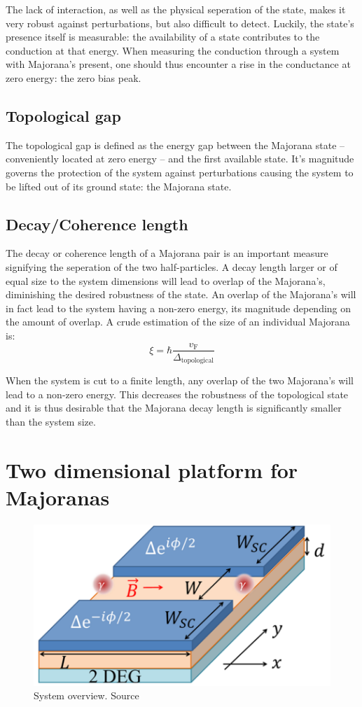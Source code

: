 		The lack of interaction, as well as the physical seperation of the state, makes it very robust against perturbations, but also difficult to detect.
		Luckily, the state's presence itself is measurable: the availability of a state contributes to the conduction at that energy.
		When measuring the conduction through a system with Majorana's present, one should thus encounter a rise in the conductance at zero energy: the zero bias peak.

	\subsection{Topological gap}
		The topological gap is defined as the energy gap between the Majorana state -- conveniently located at zero energy -- and the first available state.
		It's magnitude governs the protection of the system against perturbations causing the system to be lifted out of its ground state: the Majorana state.

	\subsection{Decay/Coherence length}
		The decay or coherence length of a Majorana pair is an important measure signifying the seperation of the two half-particles.
		A decay length larger or of equal size to the system dimensions will lead to overlap of the Majorana's, diminishing the desired robustness of the state.
		An overlap of the Majorana's will in fact lead to the system having a non-zero energy, its magnitude depending on the amount of overlap.
		A crude estimation of the size of an individual Majorana is:
		\begin{equation}
			\xi = \hbar \frac{v_\text{F}}{\Delta_\text{topological}}
			\label{eq:majorana_coherence_length}
		\end{equation}

		When the system is cut to a finite length, any overlap of the two Majorana's will lead to a non-zero energy.
		This decreases the robustness of the topological state and it is thus desirable that the Majorana decay length is significantly smaller than the system size.

\section{Two dimensional platform for Majoranas}

	\begin{figure}[!htb]
	\centering
	\includegraphics[width=0.5\columnwidth]{figures/pientka_system}
	\caption{System overview. Source\cite{pientka_topological_2017}}
	\label{fig:pientka_system}
	\end{figure}

